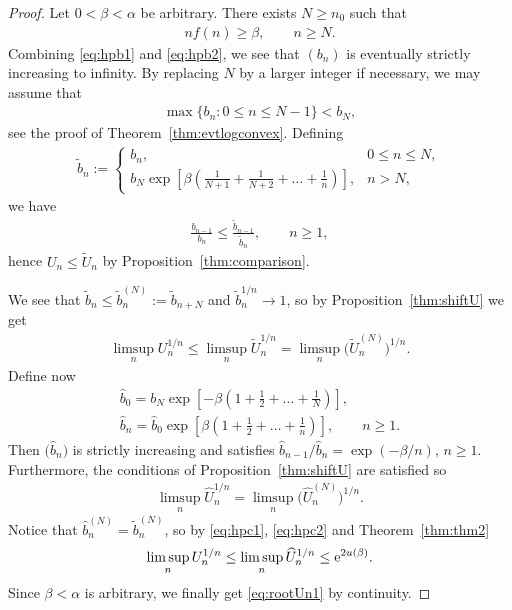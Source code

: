 \documentclass[pdftex]{sigma}
\numberwithin{equation}{section}
\begin{document}
\begin{proof}Let $0<\beta<\alpha$ be arbitrary. There exists $N\ge n_0$ such that
\begin{gather}\label{eq:hpb2}
nf(n)\ge \beta,\qquad n\ge N.
\end{gather}
Combining \eqref{eq:hpb1} and \eqref{eq:hpb2}, we see that $(b_n)$ is eventually strictly increasing to infinity. By replacing $N$ by a larger integer if necessary, we may assume that
\begin{gather*}
\max\{b_n \colon 0\le n\le N-1\}<b_{N},
\end{gather*}
see the proof of Theorem~\ref{thm:evtlogconvex}. Defining
\begin{gather*}
\tilde{b}_n:=\begin{cases} b_n,& 0\le n\le N, \\
\displaystyle b_N\exp\left[\beta\left(\frac{1}{N+1}+\frac{1}{N+2}+\dots +\frac{1}{n}\right)\right],& n>N,
\end{cases}
\end{gather*}
we have
\begin{gather*}
\frac{b_{n-1}}{b_n}\le \frac{\tilde{b}_{n-1}}{\tilde{b}_n},\qquad n\ge 1,
\end{gather*}
hence $U_n\le \tilde{U}_n$ by Proposition~\ref{thm:comparison}.

We see that $\tilde{b}_n\le \tilde{b}_n^{(N)}:=\tilde{b}_{n+N}$ and $\tilde{b}_n^{1/n}\to 1$, so by Proposition~\ref{thm:shiftU} we get
\begin{gather}\label{eq:hpc1}
\limsup_n U_n^{1/n}\le \limsup_n \tilde{U}_n^{1/n}=\limsup_n\big(\tilde{U}_n^{(N)}\big)^{1/n}.
\end{gather}
Define now
\begin{gather*}
\widehat{b}_0 = b_N\exp\left[-\beta\left(1+\frac12+\dots +\frac{1}{N}\right)\right],\\
\widehat{b}_n = \widehat{b}_0\exp\left[\beta\left(1+\frac12+\ldots +\frac{1}{n}\right)\right],\qquad n\ge 1.
\end{gather*}
Then $\big(\widehat{b}_n\big)$ is strictly increasing and satisfies $\widehat{b}_{n-1}/\widehat{b}_{n}=\exp(-\beta/n)$, $n\ge 1$. Furthermore, the conditions of Proposition~\ref{thm:shiftU} are satisfied so
\begin{gather}\label{eq:hpc2}
\limsup_n \widehat{U}_n^{1/n}=\limsup_n\big(\widehat{U}_n^{(N)}\big)^{1/n}.
\end{gather}
Notice that $\widehat{b}_n^{(N)}=\tilde{b}_n^{(N)}$, so by \eqref{eq:hpc1}, \eqref{eq:hpc2} and Theorem~\ref{thm:thm2}
\begin{gather*}
\limsup_n U_n^{1/n}\le \limsup_n \widehat{U}_n^{1/n}\le {\rm e}^{2u(\beta)}.
\end{gather*}
Since $\beta<\alpha$ is arbitrary, we finally get \eqref{eq:rootUn1} by continuity.
\end{proof}
\end{document}
